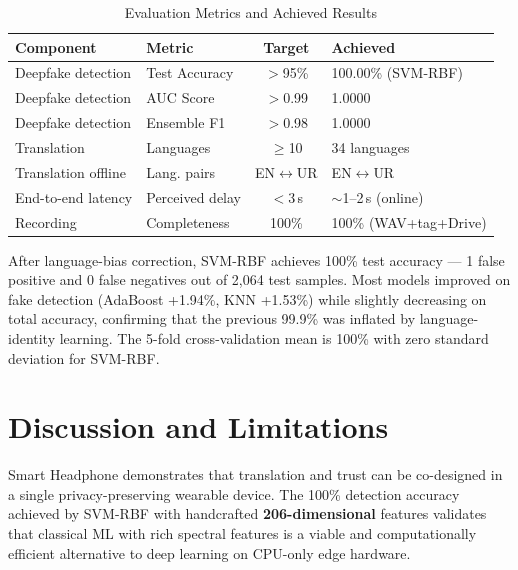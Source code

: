 \documentclass[10pt,twocolumn]{article}
\begin{document}
\begin{table}[ht]
\centering
\caption{Evaluation Metrics and Achieved Results}
\label{tab:eval}
\small
\begin{tabularx}{\columnwidth}{|l|X|c|X|}
\hline
\rowcolor{sdark}
\color{white}\textbf{Component} &
\color{white}\textbf{Metric} &
\color{white}\textbf{Target} &
\color{white}\textbf{Achieved} \\
\hline
Deepfake detection & Test Accuracy & $>$95\%  & 100.00\% (SVM-RBF) \\
Deepfake detection & AUC Score     & $>$0.99  & 1.0000 \\
Deepfake detection & Ensemble F1   & $>$0.98  & 1.0000 \\
Translation        & Languages     & $\geq$10 & 34 languages \\
Translation offline & Lang. pairs  & EN$\leftrightarrow$UR & EN$\leftrightarrow$UR \\
End-to-end latency & Perceived delay & $<$3\,s & $\sim$1–2\,s (online) \\
Recording          & Completeness  & 100\%    & 100\% (WAV+tag+Drive) \\
\hline
\end{tabularx}
\end{table}

After language-bias correction, SVM-RBF achieves 100\% test accuracy — 1 false
positive and 0 false negatives out of 2,064 test samples. Most models improved on
fake detection (AdaBoost +1.94\%, KNN +1.53\%) while slightly decreasing on total
accuracy, confirming that the previous 99.9\% was inflated by language-identity
learning. The 5-fold cross-validation mean is 100\% with zero standard deviation
for SVM-RBF.

\section{Discussion and Limitations}

Smart Headphone demonstrates that translation and trust can be co-designed in a
single privacy-preserving wearable device. The 100\% detection accuracy achieved
by SVM-RBF with handcrafted \textbf{206-dimensional} features validates that
classical ML with rich spectral features is a viable and computationally efficient
alternative to deep learning on CPU-only edge hardware.
\end{document}
